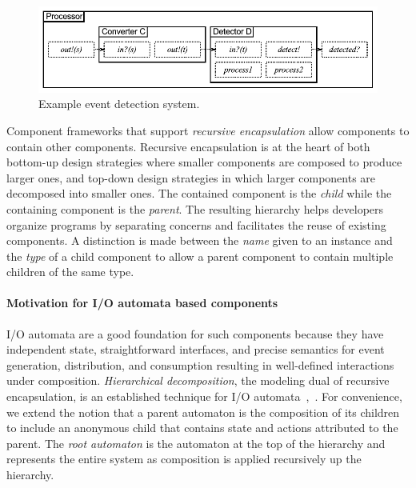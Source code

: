 \begin{figure}
\center
\includegraphics[width=\textwidth]{system_model}
\caption{Example event detection system.}
\label{sys_model}
\end{figure}
Component frameworks that support \emph{recursive encapsulation} allow components to contain other components.
Recursive encapsulation is at the heart of both bottom-up design strategies where smaller components are composed to produce larger ones, and top-down design strategies in which larger components are decomposed into smaller ones.
The contained component is the \emph{child} while the containing component is the \emph{parent}.
The resulting hierarchy helps developers organize programs by separating concerns and facilitates the reuse of existing components.
A distinction is made between the \emph{name} given to an instance and the \emph{type} of a child component to allow a parent component to contain multiple children of the same type.

\paragraph*{Motivation for I/O automata based components}
I/O automata are a good foundation for such components because they have independent state, straightforward interfaces, and precise semantics for event generation, distribution, and consumption resulting in well-defined interactions under composition.
\emph{Hierarchical decomposition}, the modeling dual of recursive encapsulation, is an established technique for I/O automata~\cite{lynch1987hierarchical},~\cite{lynch1994atomic}.
For convenience, we extend the notion that a parent automaton is the composition of its children to include an anonymous child that contains state and actions attributed to the parent.
The \emph{root automaton} is the automaton at the top of the hierarchy and represents the entire system as composition is applied recursively up the hierarchy.

